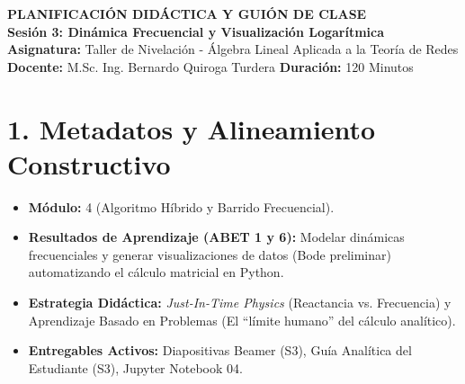 \documentclass[11pt,a4paper]{article}
\begin{document}
\begin{center}
    {\Large \textbf{\textcolor{UCBblue}{PLANIFICACIÓN DIDÁCTICA Y GUIÓN DE CLASE}}}\\
    \vspace{0.3cm}
    {\large \textbf{Sesión 3: Dinámica Frecuencial y Visualización Logarítmica}}\\
    \vspace{0.5cm}
    \textbf{Asignatura:} Taller de Nivelación - Álgebra Lineal Aplicada a la Teoría de Redes \\
    \textbf{Docente:} M.Sc. Ing. Bernardo Quiroga Turdera \quad \textbf{Duración:} 120 Minutos
\end{center}

\vspace{0.3cm}

\section*{1. Metadatos y Alineamiento Constructivo}
\begin{itemize}
    \item \textbf{Módulo:} 4 (Algoritmo Híbrido y Barrido Frecuencial).
    \item \textbf{Resultados de Aprendizaje (ABET 1 y 6):} Modelar dinámicas frecuenciales y generar visualizaciones de datos (Bode preliminar) automatizando el cálculo matricial en Python.
    \item \textbf{Estrategia Didáctica:} \textit{Just-In-Time Physics} (Reactancia vs. Frecuencia) y Aprendizaje Basado en Problemas (El ``límite humano'' del cálculo analítico).
    \item \textbf{Entregables Activos:} Diapositivas Beamer (S3), Guía Analítica del Estudiante (S3), Jupyter Notebook 04.
\end{itemize}
\end{document}
